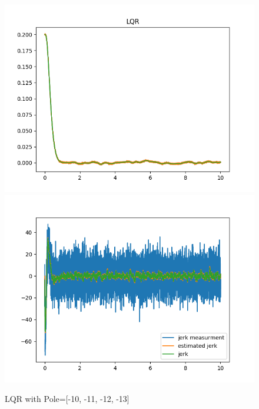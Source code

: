 \documentclass[12pt]{article}
\begin{document}
\begin{figure}[!h]
\centering
\includegraphics[scale=1]{fig/LQR_regulation.png} 
\includegraphics[scale=1]{fig/LQR_jerk_estimation.png}
\caption{LQR with Pole=[-10, -11, -12, -13]}
\label{Tux}
\end{figure}
\end{document}
